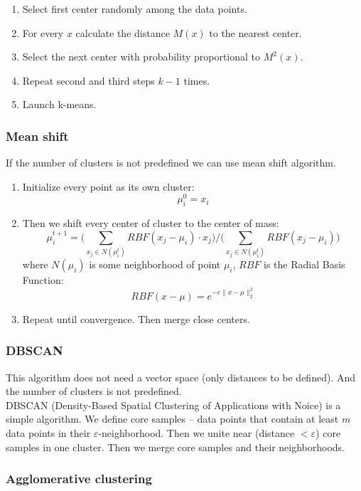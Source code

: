 \begin{enumerate}
	\item Select first center randomly among the data points.
	\item For every $x$ calculate the distance $M(x)$ to the nearest center.
	\item Select the next center with probability proportional to $M^2(x)$.
	\item Repeat second and third steps $k-1$ times.
	\item Launch k-means.
\end{enumerate}

\subsubsection{Mean shift}

If the number of clusters is not predefined we can use mean shift algorithm.
\begin{enumerate}
	\item Initialize every point as its own cluster: $$\mu_i^0=x_i$$
	\item Then we shift every center of cluster to the center of mass: $$\mu_i^{t+1}=\Big(\sum\limits_{x_j\in N(\mu_i^t)}RBF(x_j-\mu_i)\cdot x_j\Big)/\Big(\sum\limits_{x_j\in N(\mu_i^t)}RBF(x_j-\mu_i)\Big)$$ where $N(\mu_i)$ is some neighborhood of point $\mu_i$, $RBF$ is the Radial Basis Function: $$RBF(x-\mu)=e^{-c\|x-\mu\|_2^2}$$
	\item Repeat until convergence. Then merge close centers.
\end{enumerate}

\subsubsection*{DBSCAN}

This algorithm does not need a vector space (only distances to be defined). And the number of clusters is not predefined.\\
DBSCAN (Density-Based Spatial Clustering of Applications with Noice) is a simple algorithm. We define core samples -- data points that contain at least $m$ data points in their $\varepsilon$-neighborhood. Then we unite near (distance $<\varepsilon$) core samples in one cluster. Then we merge core samples and their neighborhoods.

\subsubsection*{Agglomerative clustering}

